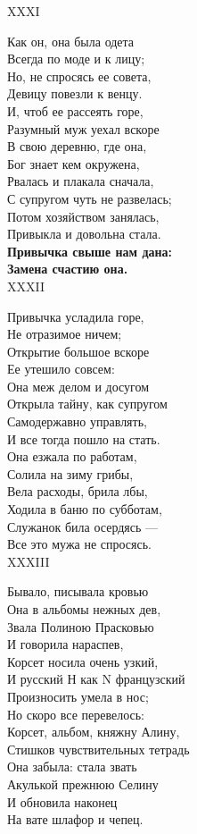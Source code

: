 XXXI

Как он, она была одета\\
Всегда по моде и к лицу;\\
Но, не спросясь ее совета,\\
Девицу повезли к венцу.\\
И, чтоб ее рассеять горе,\\
Разумный муж уехал вскоре\\
В свою деревню, где она,\\
Бог знает кем окружена,\\
Рвалась и плакала сначала,\\
С супругом чуть не развелась;\\
Потом хозяйством занялась,\\
Привыкла и довольна стала.\\
\textbf{Привычка свыше нам дана:\\
Замена счастию она.}\\

XXXII

Привычка усладила горе,\\
Не отразимое ничем;\\
Открытие большое вскоре\\
Ее утешило совсем:\\
Она меж делом и досугом\\
Открыла тайну, как супругом\\
Самодержавно управлять,\\
И все тогда пошло на стать.\\
Она езжала по работам,\\
Солила на зиму грибы,\\
Вела расходы, брила лбы,\\
Ходила в баню по субботам,\\
Служанок била осердясь —\\
Все это мужа не спросясь.\\

XXXIII

Бывало, писывала кровью\\
Она в альбомы нежных дев,\\
Звала Полиною Прасковью\\
И говорила нараспев,\\
Корсет носила очень узкий,\\
И русский Н как N французский\\
Произносить умела в нос;\\
Но скоро все перевелось:\\
Корсет, альбом, княжну Алину,\\
Стишков чувствительных тетрадь\\
Она забыла: стала звать\\
Акулькой прежнюю Селину\\
И обновила наконец\\
На вате шлафор и чепец.\\

